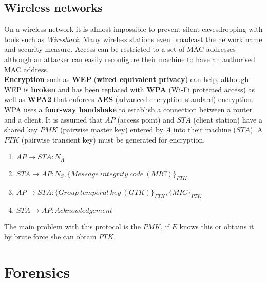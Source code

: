 \documentclass{article}
\newcommand{\np}{\vspace{8pt} \\}
\begin{document}
\subsection{Wireless networks}
On a wireless network it is almost impossible to prevent silent eavesdropping with tools such as \textit{Wireshark}. Many wireless stations even broadcast the network name and security measure. Access can be restricted to a set of MAC addresses although an attacker can easily reconfigure their machine to have an authorised MAC address. \np
\textbf{Encryption} such as \textbf{WEP} (\textbf{wired equivalent privacy}) can help, although WEP is \textbf{broken} and has been replaced with \textbf{WPA} (Wi-Fi protected access) as well as \textbf{WPA2} that enforces \textbf{AES} (advanced encryption standard) encryption. WPA uses a \textbf{four-way handshake} to establish a connection between a router and a client. It is assumed that $ AP $ (access point) and $ STA $ (client station) have a shared key $ PMK $ (pairwise master key) entered by $ A $ into their machine ($ STA $). A $ PTK $ (pairwise transient key) must be generated for encryption.
\begin{enumerate}
	\item $ AP \rightarrow STA : N_{A} $
	\item $ STA \rightarrow AP : N_{S}, \{ Message\ integrity\ code\ (MIC) \}_{PTK} $
	\item $ AP \rightarrow STA : \{ Group\ temporal\ key\ (GTK) \}_{PTK}, \{ MIC \}_{PTK} $
	\item $ STA \rightarrow AP : Acknowledgement $
\end{enumerate}
The main problem with this protocol is the $ PMK $, if $ E $ knows this or obtains it by brute force she can obtain $ PTK $.

\section{Forensics}
\end{document}
